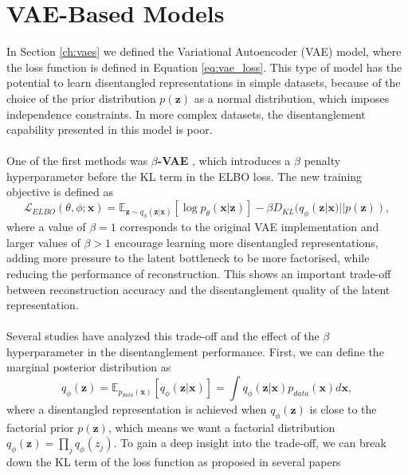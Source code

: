 \section{VAE-Based Models}  
In Section \ref{ch:vaes} we defined the Variational Autoencoder (VAE) model, where the loss function is defined in Equation \ref{eq:vae_loss}. This type of model 
has the potential to learn disentangled representations in simple datasets, because of the choice of the prior distribution $p(\mathbf{z})$ 
as a normal distribution, which imposes independence constraints. In more complex datasets, the disentanglement capability presented in this model 
is poor. \\
\\
One of the first methods was $\beta$\textbf{-VAE} \cite{higgins2017betavae}, which introduces a $\beta$ penalty hyperparameter before the KL term in the ELBO loss. The new training objective is defined as 
\begin{equation}
    \mathcal{L}_{ELBO}(\theta, \phi; \mathbf{x}) = \mathbb{E}_{\mathbf{z}\sim q_{\phi}(\mathbf{z}|\mathbf{x})}\left[\log p_{\theta}(\mathbf{x}|\mathbf{z})\right] - \beta D_{KL}(q_{\phi}(\mathbf{z}|\mathbf{x})||p(\mathbf{z})),
\end{equation}
where a value of $\beta=1$ corresponds to the original VAE implementation and larger values of $\beta>1$ encourage learning more disentangled representations, adding more pressure to the latent bottleneck 
to be more factorised, while reducing the performance of reconstruction. This shows an important trade-off between reconstruction accuracy and the disentanglement quality of the latent representation. \\
\\
Several studies have analyzed this trade-off and the effect of the $\beta$ hyperparameter in the disentanglement performance. First, we can define the marginal posterior distribution as 
\begin{equation}
    q_{\phi}(\mathbf{z}) = \mathbb{E}_{p_{data}(\mathbf{x})}\left[q_{\phi}(\mathbf{z}|\mathbf{x})\right] = \int q_{\phi}(\mathbf{z}|\mathbf{x})p_{data}(\mathbf{x})d\mathbf{x},
\end{equation}
where a disentangled representation is achieved when $q_{\phi}(\mathbf{z})$ is close to the factorial prior $p(\mathbf{z})$, which means we want a factorial distribution $q_{\phi}(\mathbf{z}) = \prod_j q_{\phi}(z_j)$.
To gain a deep insight into the trade-off, we can break down the KL term of the loss function as
proposed in several papers \cite{hoffman2016elbo, chen2019isolatingsourcesdisentanglementvariational}

